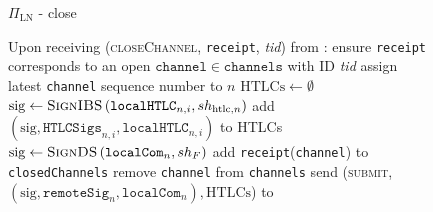   \begin{figure}[H]
    \begin{protocolbox}{$\Pi_{\mathrm{LN}}$ - close}
      \begin{algorithmic}[1]
        \State Upon receiving (\textsc{closeChannel}, \texttt{receipt},
        \textit{tid}) from \environment:
        \Indent
          \State ensure \texttt{receipt} corresponds to an open
          $\mathtt{channel} \in \mathtt{channels}$ with ID \textit{tid}
          \label{alg:protocol:close:ensure}
          \State assign latest \texttt{channel} sequence number to $n$
          \State $\mathrm{HTLCs} \gets \emptyset$
            \State $\mathrm{sig} \gets
            \textsc{SignIBS}\left(\mathtt{localHTLC}_{n, i}, sh_{\mathrm{htlc},
            n}\right)$
            \State add $\left(\mathrm{sig}, \mathtt{HTLCSigs}_{n, i},
            \mathtt{localHTLC}_{n, i}\right)$ to HTLCs
          \EndFor
          \State $\mathrm{sig} \gets \textsc{SignDS}\left(\mathtt{localCom}_n,
          sh_F\right)$
          \State add \texttt{receipt}(\texttt{channel}) to
          \texttt{closedChannels}
          \label{alg:protocol:close:report}
          \State remove \texttt{channel} from \texttt{channels}
          \label{alg:protocol:close:remove}
          \State send (\textsc{submit}, $\left(\mathrm{sig},
          \mathtt{remoteSig}_n, \mathtt{localCom}_n\right), \mathrm{HTLCs}$) to
          \ledger
          \label{alg:protocol:close:submit}
        \EndIndent
      \end{algorithmic}
    \end{protocolbox}
    \caption{}
    \label{alg:protocol:close}
  \end{figure}
